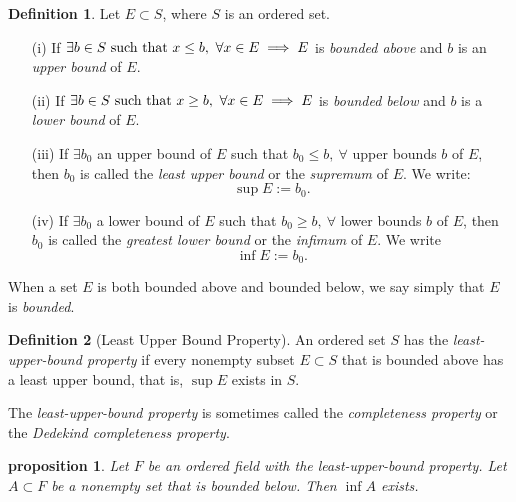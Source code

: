 \documentclass{article}
\newtheorem{proposition}{Proposition}[section]
\newtheorem{proposition}{proposition}[section]
\theoremstyle{definition}
\newtheorem{definition}{Definition}[section]
\theoremstyle{remark}
\begin{document}
\begin{definition} \label{def:bounded_set}
Let \( E \subset S \), where \( S \) is an ordered set.
\begin{itemize}
\item[(i)] If \( \exists b \in S \textnormal{ such that } x \leq b, \ \forall x \in E \implies E \) is \textit{bounded above} and \( b \) is an \textit{upper bound} of \( E \).
\item[(ii)] If \( \exists b \in S \textnormal{ such that } x \geq b, \ \forall x \in E \implies E \) is \textit{bounded below} and \( b \) is a \textit{lower bound} of \( E \).
\item[(iii)] If \( \exists b_0 \) an upper bound of \( E \) such that \( b_0 \leq b, \ \forall \) upper bounds \( b \) of \( E \), then \( b_0 \) is called the \textit{least upper bound} or the \textit{supremum} of \( E \). We write:
\[
\sup E := b_0.
\]
\item[(iv)] If \( \exists b_0 \) a lower bound of \( E \) such that \( b_0 \geq b, \ \forall \) lower bounds \( b \) of \( E \), then \( b_0 \) is called the \textit{greatest lower bound} or the \textit{infimum} of \( E \). We write
\[
\inf E := b_0.
\]
\end{itemize}
When a set \( E \) is both bounded above and bounded below, we say simply that \( E \) is \textit{bounded}.
\end{definition}













\begin{definition}[Least Upper Bound Property]\label{def:lub_property}
An ordered set $S$ has the \textit{least-upper-bound property} if every nonempty subset $ E \subset S$ that is bounded above has a least upper bound, that is, $ \sup E$ exists in $S$.
\begin{center}
The \textit{least-upper-bound property} is sometimes called the \textit{completeness property} or the \textit{Dedekind completeness property}.
\end{center}

\end{definition}






\begin{proposition} \label{prop:infimum_exists}
Let \( F \) be an ordered field with the least-upper-bound property. Let \( A \subset F \) be a nonempty set that is bounded below. Then \( \inf A \) exists.
\end{proposition}
\end{document}
